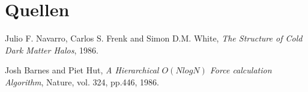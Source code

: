 \section{Quellen}

\begin{thebibliography}{99}

    Julio F. Navarro, Carlos S. Frenk and Simon D.M. White,
    \textit{The Structure of Cold Dark Matter Halos},
    1986.

    Josh Barnes and Piet Hut,
    \textit{A Hierarchical \(O ( N log N )\) Force calculation Algorithm},
    Nature,
    vol. 324, pp.446,
    1986.

\end{thebibliography}

